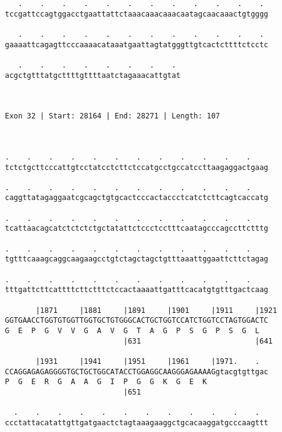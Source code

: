 \documentclass{article}
\begin{document}
\begin{Verbatim}
   .    .    .    .    .    .    .    .    .    .    .    . 
tccgattccagtggacctgaattattctaaacaaacaaacaatagcaacaaactgtgggg
                                                            
   .    .    .    .    .    .    .    .    .    .    .    . 
gaaaattcagagttcccaaaacataaatgaattagtatgggttgtcactcttttctcctc
                                                            
   .    .    .    .    .    .    .    . 
acgctgtttatgcttttgttttaatctagaaacattgtat
                                        
                                        
 
Exon 32 | Start: 28164 | End: 28271 | Length: 107



.    .    .    .    .    .    .    .    .    .    .    .    
tctctgcttcccattgtcctatcctcttctccatgcctgccatccttaagaggactgaag
                                                            
.    .    .    .    .    .    .    .    .    .    .    .    
caggttatagaggaatcgcagctgtgcactcccactaccctcatctcttcagtcaccatg
                                                            
.    .    .    .    .    .    .    .    .    .    .    .    
tcattaacagcatctctctctgctatattctccctcctttcaatagcccagccttctttg
                                                            
.    .    .    .    .    .    .    .    .    .    .    .    
tgtttcaaagcaggcaagaagcctgtctagctagctgtttaaattggaattcttctagag
                                                            
.    .    .    .    .    .    .    .    .    .    .    .    
tttgattcttcattttcttctttctccactaaaattgatttcacatgtgtttgactcaag
                                                            
       |1871     |1881     |1891     |1901     |1911     |1921
GGTGAACCTGGTGTGGTTGGTGCTGTGGGCACTGCTGGTCCATCTGGTCCTAGTGGACTC
G  E  P  G  V  V  G  A  V  G  T  A  G  P  S  G  P  S  G  L  
                           |631                          |641
  
       |1931     |1941     |1951     |1961     |1971.    .  
CCAGGAGAGAGGGGTGCTGCTGGCATACCTGGAGGCAAGGGAGAAAAGgtacgtgttgac
P  G  E  R  G  A  A  G  I  P  G  G  K  G  E  K              
                           |651                             
  
  .    .    .    .    .    .    .    .    .    .    .    .  
ccctattacatattgttgatgaactctagtaaagaaggctgcacaaggatgcccaagttt
                                                            

\end{Verbatim}
\end{document}

